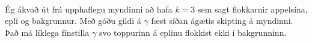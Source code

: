 \documentclass[11pt]{article}
\begin{document}
    \begin{center}
    \end{center}
    { \hspace*{\fill} \\}
    
    Ég ákvað út frá upphaflegu myndinni að hafa \(k=3\) sem sagt flokkarnir
appelsína, epli og bakgrunnur. Með góðu gildi á \(\gamma\) fæst síðan
ágætis skipting á myndinni. Það má líklega fínstilla \(\gamma\) svo
toppurinn á eplinu flokkist ekki í bakgrunninn.


    
    
    
    
\end{document}
